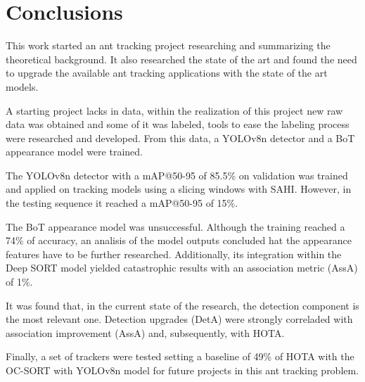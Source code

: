 
\section{Conclusions}

{
    This work started an ant tracking project researching and summarizing the theoretical background. 
    It also researched the state of the art and found the need to upgrade the available ant tracking applications with the state of the art models.
}

{
    A starting project lacks in data, within the realization of this project new raw data was obtained and some of it was labeled, 
    tools to ease the labeling process were researched and developed. 
    From this data, a \ac{YOLOv8n} detector and a \ac{BoT} appearance model were trained.
}

{
    The \ac{YOLOv8n} detector with a \ac{mAP}@50-95 of 85.5\% on validation was trained 
    and applied on tracking models using a slicing windows with \ac{SAHI}. 
    However, in the testing sequence it reached a \ac{mAP}@50-95 of 15\%. 
}

{
    The \ac{BoT} appearance model was unsuccessful. 
    Although the training reached a 74\% of accuracy, 
    an analisis of the model outputs concluded hat the appearance features have to be further researched.
    Additionally, its integration within the Deep SORT model yielded catastrophic results with an association metric (\ac{AssA}) of 1\%.
}

{
    It was found that, in the current state of the research, the detection component is the most relevant one.
    Detection upgrades (\ac{DetA}) were strongly correladed with association improvement (\ac{AssA}) and, subsequently, with \ac{HOTA}.
}

{
    Finally, a set of trackers were tested setting a baseline of 49\% of \ac{HOTA} with the OC-SORT with YOLOv8n model for future projects in this ant tracking problem.
}
